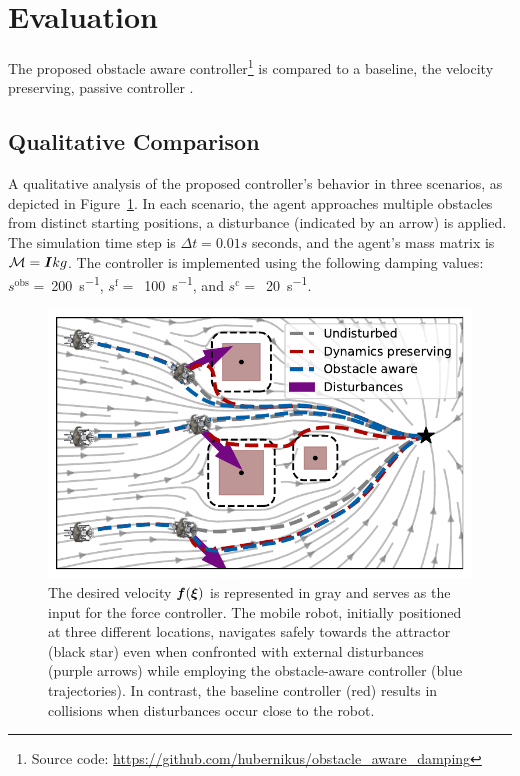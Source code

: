\section{Evaluation}  \label{sec:evaluation} 
The proposed obstacle aware controller\footnote{Source code: \url{https://github.com/hubernikus/obstacle_aware_damping}} is compared to a baseline, the velocity preserving, passive controller \parencite{kronander2015passive}.

\subsection{Qualitative Comparison} \label{sec:qual_comp}
A qualitative analysis of the proposed controller's behavior in three scenarios, as depicted in Figure~\ref{fig:obstacle_aware_damping_comparison}. In each scenario, the agent approaches multiple obstacles from distinct starting positions, a disturbance (indicated by an arrow) is applied. The simulation time step is $\Delta t = 0.01 s$ seconds, and the agent's mass matrix is $\mathcal{M} = \boldsymbol{I} kg$. The controller is implemented using the following damping values:
$s^{\mathrm{obs}}=~$\qty{200}{s^{-1}},
$s^{\mathrm{f}}=$~\qty{100}{s^{-1}}, and
$s^{\mathrm{c}}=$~\qty{20}{s^{-1}}.

\begin{figure}[htbp]
  \centering
  \centerline{\includegraphics[width=0.95\columnwidth]{figures/multi_obstacle_with_damping.pdf}}
  \caption{
  The desired velocity $\boldsymbol{f}(\boldsymbol{\xi})$ is represented in gray and serves as the input for the force controller. The mobile robot, initially positioned at three different locations, navigates safely towards the attractor (black star) even when confronted with external disturbances (purple arrows) while employing the obstacle-aware controller (blue trajectories). In contrast, the baseline controller (red) results in collisions when disturbances occur close to the robot.
  }
  \label{fig:obstacle_aware_damping_comparison}
\end{figure}

